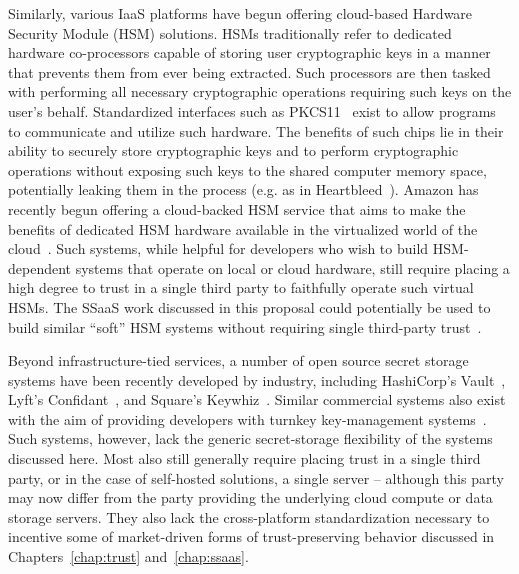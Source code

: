 Similarly, various IaaS platforms have begun offering cloud-based
Hardware Security Module (HSM) solutions. HSMs traditionally refer to
dedicated hardware co-processors capable of storing user cryptographic
keys in a manner that prevents them from ever being extracted. Such
processors are then tasked with performing all necessary cryptographic
operations requiring such keys on the user's behalf. Standardized
interfaces such as PKCS11~\cite{pcks11-standard} exist to allow
programs to communicate and utilize such hardware. The benefits of
such chips lie in their ability to securely store cryptographic keys
and to perform cryptographic operations without exposing such keys to
the shared computer memory space, potentially leaking them in the
process (e.g. as in Heartbleed~\cite{heartbleed}). Amazon has recently
begun offering a cloud-backed HSM service that aims to make the
benefits of dedicated HSM hardware available in the virtualized world
of the cloud~\cite{amazon-hsm}. Such systems, while helpful for
developers who wish to build HSM-dependent systems that operate on
local or cloud hardware, still require placing a high degree to trust
in a single third party to faithfully operate such virtual HSMs. The
SSaaS work discussed in this proposal could potentially be used to
build similar ``soft'' HSM systems without requiring single
third-party trust~\cite{lorier-pkcs11}.

Beyond infrastructure-tied services, a number of open source secret
storage systems have been recently developed by industry, including
HashiCorp's Vault~\cite{vault}, Lyft's Confidant~\cite{confidant}, and
Square's Keywhiz~\cite{keywhiz}. Similar commercial systems also exist
with the aim of providing developers with turnkey key-management
systems~\cite{gazzang, porticor, rosen2012}. Such systems, however,
lack the generic secret-storage flexibility of the systems discussed
here. Most also still generally require placing trust in a single
third party, or in the case of self-hosted solutions, a single server
-- although this party may now differ from the party providing the
underlying cloud compute or data storage servers. They also lack the
cross-platform standardization necessary to incentive some of
market-driven forms of trust-preserving behavior discussed in
Chapters~\ref{chap:trust} and~\ref{chap:ssaas}.

